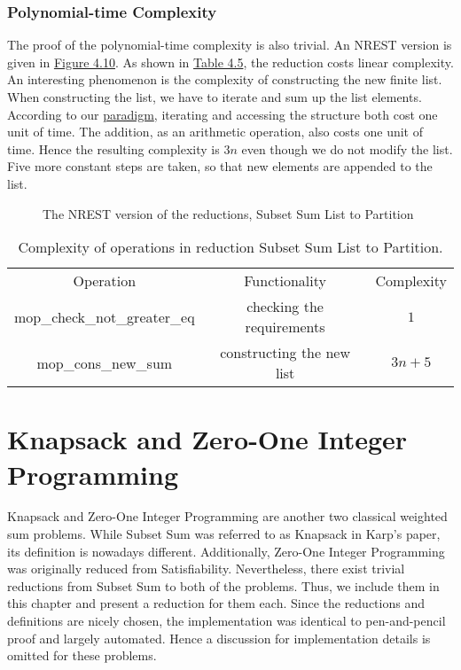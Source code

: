 \subsubsection{Polynomial-time Complexity}
The proof of the polynomial-time complexity is also trivial. 
An NREST version is given in \hyperref[fig:4.10]{Figure 4.10}. 
As shown in \hyperref[table:4.5]{Table 4.5}, the reduction costs linear complexity. 
An interesting phenomenon is the complexity of constructing the new finite list. 
When constructing the list, we have to iterate and sum up the list elements.
According to our \hyperref[para1]{paradigm}, iterating and accessing the structure both cost one unit of time. 
The addition, as an arithmetic operation, also costs one unit of time.
Hence the resulting complexity is $3n$ even though we do not modify the list.
Five more constant steps are taken, so that new elements are appended to the list.
\begin{figure}[!h]
    \caption{The NREST version of the reductions, Subset Sum List to Partition}
    \label{fig:4.10}
\end{figure}
\begin{table}[!h]
    \centering 
    \begin{tabular}{| c | c | c |}
        \hline 
        Operation & Functionality & Complexity \\ 
        \hhline{|=|=|=|}
        mop\_check\_not\_greater\_eq & checking the requirements & $1$ \\ 
        \hline 
        mop\_cons\_new\_sum & constructing the new list & $3n + 5$ \\ 
        \hline 
    \end{tabular}
    \caption{Complexity of operations in reduction Subset Sum List to Partition.}
    \label{table:4.5}
\end{table}

\section{Knapsack and Zero-One Integer Programming}
Knapsack and Zero-One Integer Programming are another two classical weighted sum problems. While Subset Sum was referred 
to as Knapsack in Karp's paper, its definition is nowadays different. Additionally, Zero-One Integer Programming 
was originally reduced from Satisfiability. Nevertheless, there exist trivial reductions from Subset Sum to both of the problems. Thus, 
we include them in this chapter and present a reduction for them each. 
Since the reductions and definitions are nicely chosen, the implementation was identical to pen-and-pencil proof 
and largely automated. Hence a discussion for implementation details is omitted for these problems.

